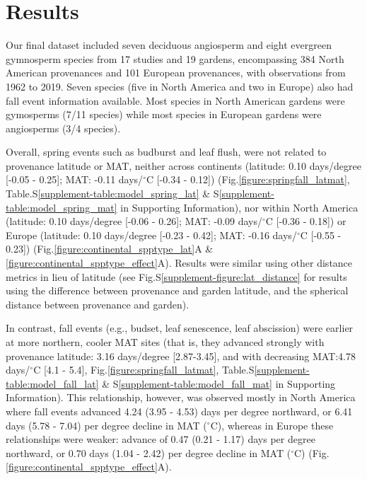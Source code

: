 \documentclass[12pt]{article}
\begin{document}

\section{Results}
Our final dataset included seven deciduous angiosperm and eight evergreen gymnosperm species from 17 studies and 19 gardens, encompassing 384 North American provenances and 101 European provenances, with observations from 1962 to 2019. Seven species (five in North America and two in Europe) also had fall event information available. Most species in North American gardens were gymosperms (7/11 species) while most species in European gardens were angiosperms (3/4 species).  


Overall, spring events such as budburst and leaf flush, were not related to provenance latitude or MAT, neither across continents (latitude: 0.10 days/degree [-0.05 - 0.25]; MAT: -0.11 days/$^{\circ}$C [-0.34 - 0.12]) (Fig.\ref{figure:springfall_latmat}, Table.S\ref{supplement-table:model_spring_lat} \& S\ref{supplement-table:model_spring_mat} in Supporting Information), nor within North America (latitude: 0.10 days/degree [-0.06 - 0.26]; MAT: -0.09 days/$^{\circ}$C [-0.36 - 0.18]) or Europe (latitude: 0.10 days/degree [-0.23 - 0.42]; MAT: -0.16 days/$^{\circ}$C [-0.55 - 0.23]) (Fig.\ref{figure:continental_spptype_lat}A \& \ref{figure:continental_spptype_effect}A). Results were similar using other distance metrics in lieu of latitude (see Fig.S\ref{supplement-figure:lat_distance} for results using the difference between provenance and garden latitude, and the spherical distance between provenance and garden).



In contrast, fall events (e.g., budset, leaf senescence, leaf abscission) were earlier at more northern, cooler MAT sites (that is, they advanced strongly with provenance latitude: 3.16 days/degree [2.87-3.45], and with decreasing MAT:4.78 days/$^{\circ}$C [4.1 - 5.4], Fig.\ref{figure:springfall_latmat}, Table.S\ref{supplement-table:model_fall_lat} \& S\ref{supplement-table:model_fall_mat} in Supporting Information). This relationship, however, was observed mostly in North America where fall events advanced 4.24 (3.95 - 4.53) days per degree northward, or 6.41 days (5.78 - 7.04) per degree decline in MAT ($^{\circ}$C), whereas in Europe these relationships were weaker: advance of 0.47 (0.21 - 1.17) days per degree northward, or 0.70 days (1.04 - 2.42) per degree decline in MAT ($^{\circ}$C) (Fig.\ref{figure:continental_spptype_effect}A).
\end{document}
